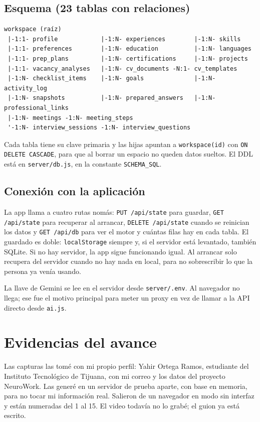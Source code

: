 \documentclass[runningheads]{llncs}
\begin{document}
\subsection{Esquema (23 tablas con relaciones)}
\begin{verbatim}
workspace (raíz)
 |-1:1- profile            |-1:N- experiences        |-1:N- skills
 |-1:1- preferences        |-1:N- education          |-1:N- languages
 |-1:1- prep_plans         |-1:N- certifications     |-1:N- projects
 |-1:1- vacancy_analyses   |-1:N- cv_documents -N:1- cv_templates
 |-1:N- checklist_items    |-1:N- goals              |-1:N- activity_log
 |-1:N- snapshots          |-1:N- prepared_answers   |-1:N- professional_links
 |-1:N- meetings -1:N- meeting_steps
 '-1:N- interview_sessions -1:N- interview_questions
\end{verbatim}
Cada tabla tiene su clave primaria y las hijas apuntan a \texttt{workspace(id)} con
\texttt{ON DELETE CASCADE}, para que al borrar un espacio no queden datos sueltos. El DDL está
en \texttt{server/db.js}, en la constante \texttt{SCHEMA_SQL}.

\subsection{Conexión con la aplicación}
La app llama a cuatro rutas nomás: \texttt{PUT /api/state} para guardar,
\texttt{GET /api/state} para recuperar al arrancar, \texttt{DELETE /api/state} cuando se
reinician los datos y \texttt{GET /api/db} para ver el motor y cuántas filas hay en cada tabla.
El guardado es doble: \texttt{localStorage} siempre y, si el servidor está levantado, también
SQLite. Si no hay servidor, la app sigue funcionando igual. Al arrancar solo recupera del
servidor cuando no hay nada en local, para no sobrescribir lo que la persona ya venía usando.

La llave de Gemini se lee en el servidor desde \texttt{server/.env}. Al navegador no llega; ese
fue el motivo principal para meter un proxy en vez de llamar a la API directo desde
\texttt{ai.js}.

\section{Evidencias del avance}
Las capturas las tomé con mi propio perfil: Yahir Ortega Ramos, estudiante del Instituto
Tecnológico de Tijuana, con mi correo y los datos del proyecto NeuroWork. Las generé en un
servidor de prueba aparte, con base en memoria, para no tocar mi información real. Salieron de
un navegador en modo sin interfaz y están numeradas del 1 al 15. El video todavía no lo grabé;
el guion ya está escrito.
\end{document}
